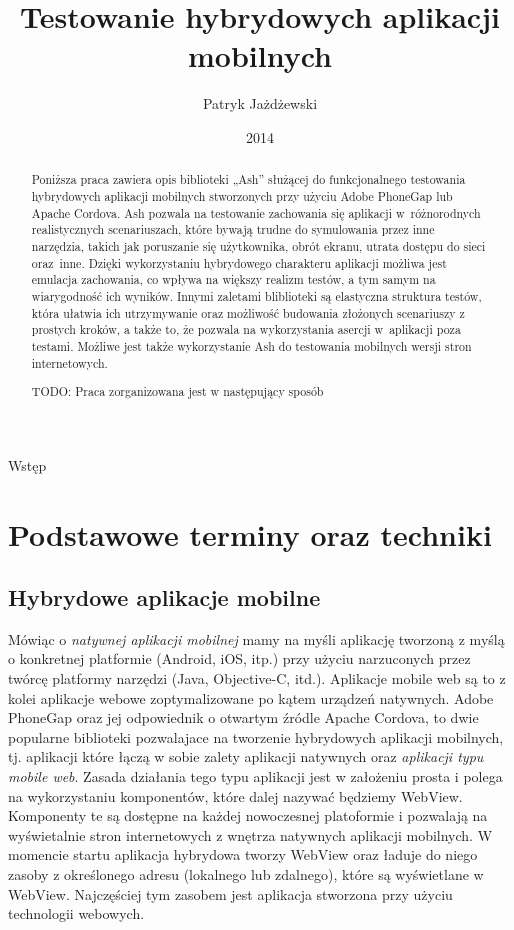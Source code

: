 \documentclass[brudnopis]{xmgr}
\author   {Patryk Jażdżewski}
\title    {Testowanie hybrydowych aplikacji mobilnych}
\date     {2014}
\begin{document}
\begin{abstract}
  Poniższa praca zawiera opis biblioteki „Ash” służącej do funkcjonalnego testowania
hybrydowych aplikacji mobilnych stworzonych przy użyciu Adobe PhoneGap lub
Apache Cordova. Ash pozwala na testowanie zachowania się aplikacji w~różnorodnych
realistycznych scenariuszach, które bywają trudne do symulowania przez inne narzędzia, takich jak poruszanie się użytkownika,
obrót ekranu, utrata dostępu do sieci oraz~inne. Dzięki wykorzystaniu hybrydowego charakteru aplikacji
możliwa jest emulacja zachowania, co wpływa na większy realizm testów, a tym samym na wiarygodność ich wyników. Innymi
zaletami bliblioteki są elastyczna struktura testów, która ułatwia ich utrzymywanie oraz możliwość budowania złożonych scenariuszy z prostych kroków, a także
to, że pozwala na wykorzystania asercji w~aplikacji poza testami.
Możliwe jest także wykorzystanie Ash do testowania mobilnych wersji stron internetowych. 

TODO: Praca zorganizowana jest w następujący sposób
\end{abstract}

\maketitle

\introduction

Wstęp

\chapter{Podstawowe terminy oraz techniki}
\section{Hybrydowe aplikacje mobilne}
Mówiąc o \textit{natywnej aplikacji mobilnej} mamy na myśli aplikację tworzoną z myślą o konkretnej platformie (Android, iOS, itp.) przy użyciu narzuconych przez twórcę platformy narzędzi (Java, Objective-C, itd.). Aplikacje mobile web są to z kolei aplikacje webowe zoptymalizowane po kątem urządzeń natywnych.
Adobe PhoneGap oraz jej odpowiednik o otwartym źródle Apache Cordova, to
dwie popularne biblioteki pozwalajace na tworzenie hybrydowych aplikacji
mobilnych, tj. aplikacji które łączą w sobie zalety aplikacji natywnych oraz \textit{aplikacji
typu mobile web}. Zasada działania tego typu aplikacji jest w założeniu prosta i
polega na wykorzystaniu komponentów, które dalej nazywać będziemy WebView.
Komponenty te są dostępne na każdej nowoczesnej platoformie i pozwalają na
wyświetalnie stron internetowych z wnętrza natywnych aplikacji mobilnych. 
W momencie startu aplikacja hybrydowa tworzy WebView oraz ładuje do niego zasoby z określonego adresu (lokalnego lub zdalnego), które są wyświetlane w WebView. Najczęściej tym zasobem jest aplikacja stworzona przy użyciu technologii webowych.     
\end{document}
